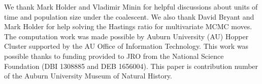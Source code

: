 We thank Mark Holder and Vladimir Minin for helpful discussions about units of
time and population size under the coalescent.
We also thank David Bryant and Mark Holder for help solving the Hastings ratio
for multivariate MCMC moves.
The computation work was made possible by Auburn University (AU) Hopper Cluster
supported by the AU Office of Information Technology.
This work was possible thanks to funding provided to JRO from the National
Science Foundation (DBI 1308885 and DEB 1656004).
This paper is contribution number  of the Auburn University
Museum of Natural History.

